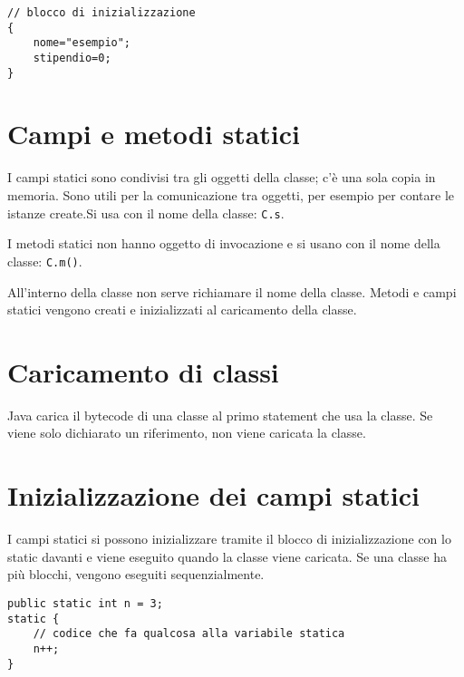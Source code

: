 \begin{lstlisting}
// blocco di inizializzazione
{ 
    nome="esempio";
    stipendio=0;
}
\end{lstlisting}
 

\section{Campi e metodi statici}
I campi statici sono condivisi tra gli oggetti della classe; c'è una sola copia in memoria. Sono utili per la comunicazione tra oggetti, per esempio per contare le istanze create.Si usa con il nome della classe: \texttt{C.s}.

I metodi statici non hanno oggetto di invocazione e si usano con il nome della classe: \texttt{C.m()}.

All'interno della classe non serve richiamare il nome della classe.
Metodi e campi statici vengono creati e inizializzati al caricamento della classe.

\section{Caricamento di classi}
Java carica il bytecode di una classe al primo statement che usa la classe. Se viene solo dichiarato un riferimento, non viene caricata la classe.

\section{Inizializzazione dei campi statici}
I campi statici si possono inizializzare tramite il blocco di inizializzazione con lo static davanti e viene eseguito quando la classe viene caricata. Se una classe ha più blocchi, vengono eseguiti sequenzialmente.

\begin{lstlisting}
public static int n = 3;
static {
	// codice che fa qualcosa alla variabile statica
	n++;
}
\end{lstlisting}

